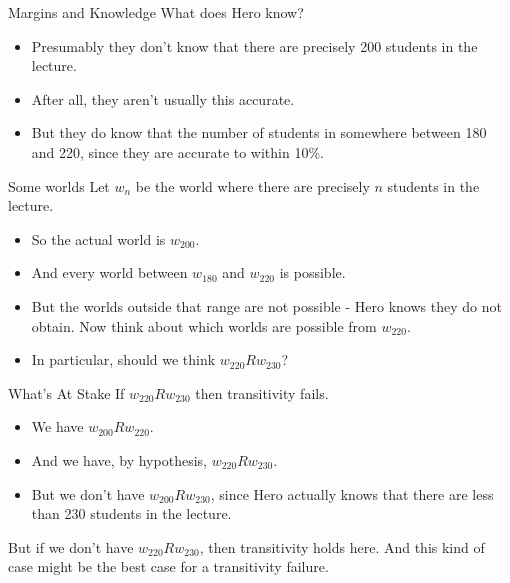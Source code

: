 \documentclass[
  ignorenonframetext,
]{beamer}
\providecommand{\tightlist}{%
  \setlength{\itemsep}{0pt}\setlength{\parskip}{0pt}}
\renewcommand{\,}{\text{, }}
\begin{document}
\begin{frame}{Margins and Knowledge}
\protect\hypertarget{margins-and-knowledge}{}
What does Hero know?

\begin{itemize}
\tightlist
\item
  Presumably they don't know that there are precisely 200 students in
  the lecture.
\item
  After all, they aren't usually this accurate.
\item
  But they do know that the number of students in somewhere between 180
  and 220, since they are accurate to within 10\%.
\end{itemize}
\end{frame}

\begin{frame}{Some worlds}
\protect\hypertarget{some-worlds}{}
Let \(w_n\) be the world where there are precisely \(n\) students in the
lecture.

\begin{itemize}
\tightlist
\item
  So the actual world is \(w_{200}\).
\item
  And every world between \(w_{180}\) and \(w_{220}\) is possible.
  \pause 
\item
  But the worlds outside that range are not possible - Hero knows they
  do not obtain. \pause Now think about which worlds are possible from
  \(w_{220}\). \pause 
\item
  In particular, should we think \(w_{220}Rw_{230}\)?
\end{itemize}
\end{frame}

\begin{frame}{What's At Stake}
\protect\hypertarget{whats-at-stake}{}
If \(w_{220}Rw_{230}\) then transitivity fails.

\begin{itemize}
\tightlist
\item
  We have \(w_{200}Rw_{220}\).
\item
  And we have, by hypothesis, \(w_{220}Rw_{230}\).
\item
  But we don't have \(w_{200}Rw_{230}\), since Hero actually knows that
  there are less than 230 students in the lecture. \pause 
\end{itemize}

But if we don't have \(w_{220}Rw_{230}\), then transitivity holds here.
And this kind of case might be the best case for a transitivity failure.
\end{frame}
\end{document}
